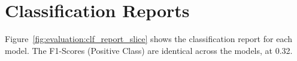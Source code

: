 \chapter{Classification Reports}
\label{appendix:classification_reports}

Figure~\ref{fig:evaluation:clf_report_slice} shows the classification report for each model. The F1-Scores (Positive Class) are identical across the models, at 0.32.

\begin{table}[!htb]
    \centering
    \scalebox{0.9}{}
    \caption[Classification report by slice date]{} %
    \label{fig:evaluation:clf_report_slice}
\end{table}

\begin{table}[!htb]
    \centering
    \scalebox{0.9}{}
    \caption[Classification report by forecast window]{}
    \label{fig:evaluation:clf_report_window}
\end{table}

\begin{table}[!htb]
    \centering
    \scalebox{0.9}{}
    \caption[Classification report by developmental stage]{}
    \label{fig:evaluation:clf_report_stage}
\end{table}

\begin{table}[!htb]
    \centering
    \scalebox{0.9}{}
    \caption[Classification report by target outcome]{}
    \label{fig:evaluation:clf_report_outcome}
\end{table}

